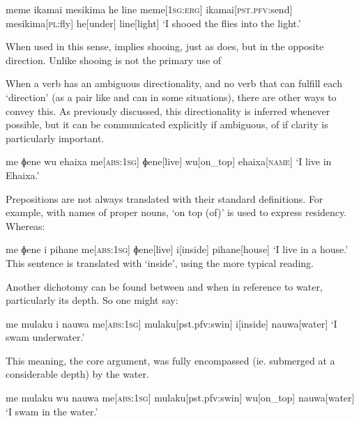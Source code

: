 \ex
\begingl
\glpreamble meme ikamai mesikima he line
\endpreamble
meme[\textsc{1sg:erg}]
ikamai[\textsc{pst.pfv:}send]
mesikima[\textsc{pl:}fly]
he[under]
line[light]
\glft `I shooed the flies into the light.'\footnotemark
\endgl
\xe

When used in this sense,  implies shooing, just as  does, but in the opposite direction. Unlike  shooing is not the primary use of 


When a verb has an ambiguous directionality, and no verb that can fulfill each `direction' (as a pair like  and  can in some situations), there are other ways to convey this. As previously discussed, this directionality is inferred whenever possible, but it can be communicated explicitly if ambiguous, of if clarity is particularly important.

\ex
\begingl
\glpreamble me ɸene wu ehaixa
\endpreamble
me[\textsc{abs:1sg}]
ɸene[live]
wu[on\_top]
ehaixa[\textsc{name}]
\glft `I live in Ehaixa.'
\endgl
\xe

Prepositions are not always translated with their standard definitions. For example, with names of proper nouns,  `on top (of)' is used to express residency. Whereas:

\ex
\begingl
\glpreamble me ɸene i pihane
\endpreamble
me[\textsc{abs:1sg}]
ɸene[live]
i[inside]
pihane[house]
\glft `I live in a house.'
\endgl
\xe
This sentence is translated with  `inside', using the more typical reading.

Another dichotomy can be found between  and  when in reference to water, particularly its depth. So one might say:

\ex
\begingl
\glpreamble me mulaku i nauwa
\endpreamble
me[\textsc{abs:1sg}]
mulaku[pst.pfv:swin]
i[inside]
nauwa[water]
\glft `I swam underwater.'
\endgl
\xe

This meaning, the core argument,  was fully encompassed (ie. submerged at a considerable depth) by the water.

\ex
\begingl
\glpreamble me mulaku wu nauwa
\endpreamble
me[\textsc{abs:1sg}]
mulaku[pst.pfv:swin]
wu[on\_top]
nauwa[water]
\glft `I swam in the water.'
\endgl
\xe

